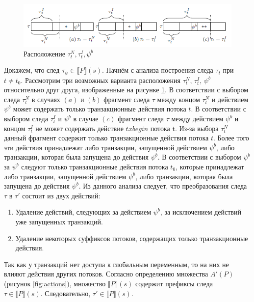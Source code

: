 \begin{myproof}
\begin{figure}
\centering
\includegraphics[width=\textwidth]{img/cases.png}
\caption{\label{fig:cases} Расположение $\tau^N_t, \tau^I_t, \psi^b$} 
\end{figure}
Докажем, что след $\tau_{\psi} \in \llbracket P \rrbracket (s)$. Начнём с анализа построения следа $\tau_t$ при $t \neq t_0$. Рассмотрим три возможных варианта расположения $\tau^N_t$, $\tau^I_t$, $\psi^b$ относительно друг друга, изображенные на рисунке \ref{fig:cases}. В соответствии с выбором следа $\tau^N_t$ в случаях $(a)$ и $(b)$ фрагмент следа $\tau$ между концом $\tau^N_t$ и действием $\psi^b$ может содержать только транзакционные действия потока $t$. В соответствии с выбором следа $\tau^I_t$ и $\psi^b$ в случае $(c)$ фрагмент следа $\tau$ между действием $\psi^b$ и концом $\tau^I_t$ не может содержать действие $txbegin$ потока t. Из-за выбора $\tau^N_t$ данный фрагмент содержит только транзакционные действия потока $t$. Более того эти действия принадлежат либо транзакции, запущенной действием $\psi^b$, либо транзакции, которая была запущена до действия $\psi^b$. В соответствии с выбором $\psi^b$ за $\psi^b$ следуют только транзакционные действия потока $t_0$, которые принадлежат либо транзакции, запущенной действием $\psi^b$, либо транзакции, которая была запущена до действия $\psi^b$. Из данного анализа следует, что преобразования следа $\tau$ в $\tau'$ состоит из двух действий:
\begin{enumerate}[label=(\roman*)]
\item Удаление действий, следующих за действием $\psi^b$, за исключением действий уже запущенных транзакций.
\item Удаление некоторых суффиксов потоков, содержащих только транзакционные действия. 
\end{enumerate}
Так как у транзакций нет доступа к глобальным переменным, то на них не влияют действия других потоков. Согласно определению множества $A'(P)$ (рисунок \ref{fig:actions}), множество $\llbracket P\rrbracket(s)$ содержит префиксы следа $\tau \in \llbracket P\rrbracket(s)$. Следовательно, $\tau' \in \llbracket P\rrbracket(s)$.


\end{myproof}
